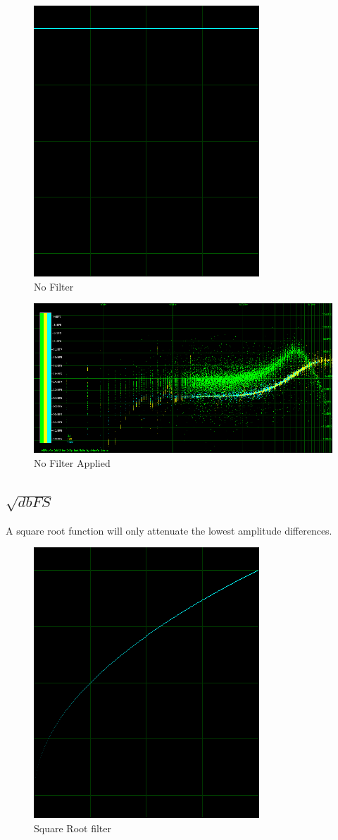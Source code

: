 \documentclass[10pt,a4paper]{report}
\begin{document}
\begin{figure}[H]
	\centering
	\includegraphics[width=0.4\linewidth]{plots/BetaFunctionPlot_0}
	\caption[No Filter]{No Filter}
	\label{fig:betafunctionplot0}
\end{figure}

\begin{figure}[H]
	\centering
	\includegraphics[width=1\linewidth]{plots/BetaFunctionPlot_0_Data}
	\caption[No Filter]{No Filter Applied}
	\label{fig:betafunctionplot0data}
\end{figure}

\newpage
\subsection{$\sqrt{dbFS}$} 

A square root function will only attenuate the lowest amplitude differences.

\begin{figure}[H]
	\centering
	\includegraphics[width=0.4\linewidth]{plots/BetaFunctionPlot_1}
	\caption[Square Root filter]{Square Root filter}
	\label{fig:betafunctionplot1}
\end{figure}
\end{document}
